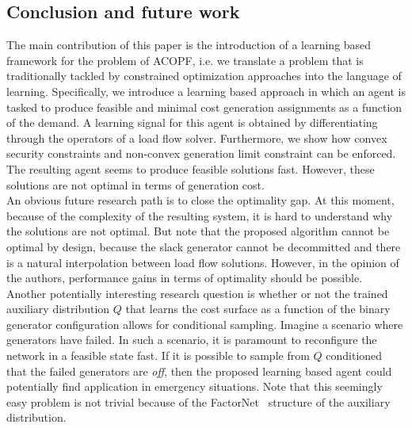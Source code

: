 \subsection{Conclusion and future work}
\label{sec:LOPFconclusion}
The main contribution of this paper is the introduction of a learning based framework for the problem of ACOPF, i.e. we translate a problem that is traditionally tackled by constrained optimization approaches into the language of learning. Specifically, we introduce a learning based approach in which an agent is tasked to produce feasible and minimal cost generation assignments as a function of the demand. A learning signal for this agent is obtained by differentiating through the operators of a load flow solver. Furthermore, we show how convex security constraints and non-convex generation limit constraint can be enforced. The resulting agent seems to produce feasible solutions fast. However, these solutions are not optimal in terms of generation cost.\\
An obvious future research path is to close the optimality gap. At this moment, because of the complexity of the resulting system, it is hard to understand why the solutions are not optimal. But note that the proposed algorithm cannot be optimal by design, because the slack generator cannot be decommitted and there is a natural interpolation between load flow solutions. However, in the opinion of the authors, performance gains in terms of optimality should be possible.\\
Another potentially interesting research question is whether or not the trained auxiliary distribution $Q$ that learns the cost surface as a function of the binary generator configuration allows for conditional sampling. Imagine a scenario where generators have failed. In such a scenario, it is paramount to reconfigure the network in a feasible state fast. If it is possible to sample from $Q$ conditioned that the failed generators are \emph{off}, then the proposed learning based agent could potentially find application in emergency situations. Note that this seemingly easy problem is not trivial because of the FactorNet~\cite{lange2018factornet} structure of the auxiliary distribution.\\
